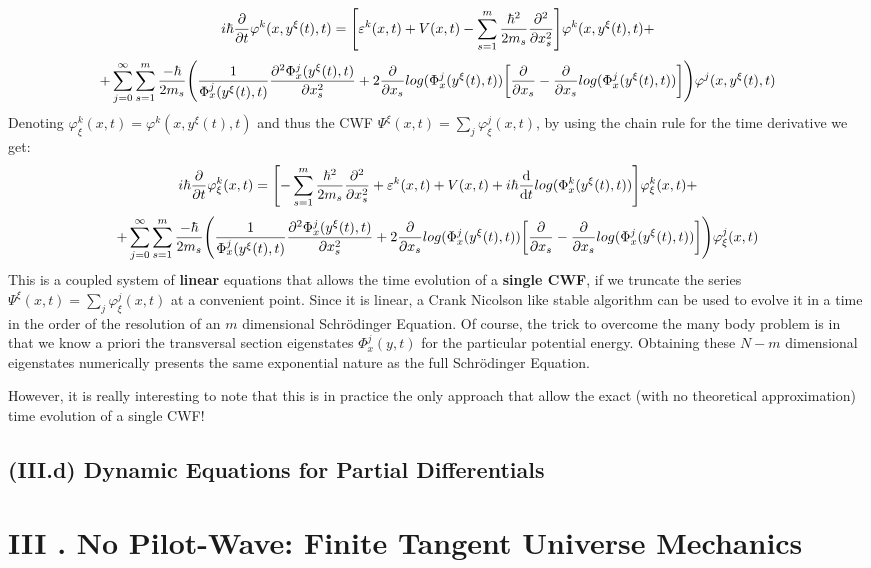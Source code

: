 \documentclass[11pt, a4paper]{article} %
\begin{document}
\begin{equation}
 i\hbar\pdv{}{t}\varphi^k(x,y^\xi(t),t)=\qty[ \varepsilon^k(x,t)+V(x,t)  -\sum_{s=1}^m\frac{\hbar^2}{2m_s}\pdv[2]{}{x_s} ]\varphi^k(x,y^\xi(t),t)+
\end{equation}
$$
+\sum_{j=0}^\infty\sum_{s=1}^m \frac{-\hbar}{2m_s}\qty( \frac{1}{\Phi^j_x(y^\xi(t),t)}\pdv[2]{\Phi^j_x(y^\xi(t),t)}{x_s}+2\pdv{}{x_s}log(\Phi^j_x(y^\xi(t),t))\qty[\pdv{}{x_s}-\pdv{}{x_s}log(\Phi^j_x(y^\xi(t),t))] )\varphi^j(x,y^\xi(t),t)
$$
Denoting $\varphi^k_\xi(x,t)=\varphi^k(x,y^\xi(t),t)$ and thus the CWF $\Psi^\xi(x,t)=\sum_j \varphi^j_\xi(x,t)$, by using the chain rule for the time derivative we get:
\begin{equation}\label{XabEq3}
 i\hbar\pdv{}{t}\varphi^k_\xi(x,t)=\qty[-\sum_{s=1}^m\frac{\hbar^2}{2m_s}\pdv[2]{}{x_s}+ \varepsilon^k(x,t)+V(x,t)   +i\hbar \dv{}{t}log(\Phi^k_x(y^\xi(t),t))]\varphi^k_\xi(x,t)+
\end{equation}
$$
+\sum_{j=0}^\infty\sum_{s=1}^m \frac{-\hbar}{2m_s}\qty( \frac{1}{\Phi^j_x(y^\xi(t),t)}\pdv[2]{\Phi^j_x(y^\xi(t),t)}{x_s}+2\pdv{}{x_s}log(\Phi^j_x(y^\xi(t),t))\qty[\pdv{}{x_s}-\pdv{}{x_s}log(\Phi^j_x(y^\xi(t),t))] )\varphi^j_\xi(x,t)
$$
This is a coupled system of {\bf linear} equations that allows the time evolution of a {\bf single CWF}, if we truncate the series $\Psi^\xi(x,t)=\sum_j \varphi^j_\xi(x,t)$ at a convenient point. Since it is linear, a Crank Nicolson like stable algorithm can be used to evolve it in a time in the order of the resolution of an $m$ dimensional Schrödinger Equation. Of course, the trick to overcome the many body problem is in that we know a priori the transversal section eigenstates $\Phi^j_x(y,t)$ for the particular potential energy. Obtaining these $N-m$ dimensional eigenstates numerically presents the same exponential nature as the full Schrödinger Equation.

However, it is really interesting to note that this is in practice the only approach that allow the exact (with no theoretical approximation) time evolution of a single CWF!






\subsection*{(III.d) Dynamic Equations for Partial Differentials}


\section*{III . No Pilot-Wave: Finite Tangent Universe Mechanics}
\end{document}
